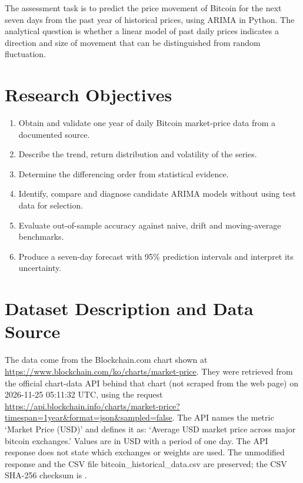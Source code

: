 \documentclass[11pt,a4paper]{article}
\begin{document}
The assessment task is to predict the price movement of Bitcoin for the next seven days from the past year of historical prices, using ARIMA in Python. The analytical question is whether a linear model of past daily prices indicates a direction and size of movement that can be distinguished from random fluctuation.

\section{Research Objectives}

\begin{enumerate}
  \item Obtain and validate one year of daily Bitcoin market-price data from a documented source.
  \item Describe the trend, return distribution and volatility of the series.
  \item Determine the differencing order from statistical evidence.
  \item Identify, compare and diagnose candidate ARIMA models without using test data for selection.
  \item Evaluate out-of-sample accuracy against naive, drift and moving-average benchmarks.
  \item Produce a seven-day forecast with 95\% prediction intervals and interpret its uncertainty.
\end{enumerate}

\section{Dataset Description and Data Source}

The data come from the Blockchain.com chart shown at \url{https://www.blockchain.com/ko/charts/market-price}. They were retrieved from the official chart-data API behind that chart (not scraped from the web page) on 2026-11-25 05:11:32 UTC, using the request \url{https://api.blockchain.info/charts/market-price?timespan=1year&format=json&sampled=false}. The API names the metric `Market Price (USD)' and defines it as: `Average USD market price across major bitcoin exchanges.' Values are in USD with a period of one day. The API response does not state which exchanges or weights are used. The unmodified response and the CSV file bitcoin\_historical\_data.csv are preserved; the CSV SHA-256 checksum is {\ttfamily{}}.
\end{document}
